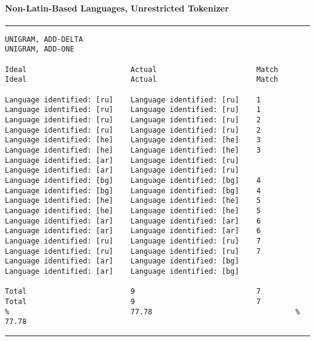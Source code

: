 \clearpage

\paragraph{Non-Latin-Based Languages, Unrestricted Tokenizer}

\tiny
\hrule\vskip4pt
\begin{verbatim}
UNIGRAM, ADD-DELTA                                                 UNIGRAM, ADD-ONE

Ideal                        Actual                       Match    Ideal                        Actual                       Match

Language identified: [ru]    Language identified: [ru]    1        Language identified: [ru]    Language identified: [ru]    1
Language identified: [ru]    Language identified: [ru]    2        Language identified: [ru]    Language identified: [ru]    2
Language identified: [he]    Language identified: [he]    3        Language identified: [he]    Language identified: [he]    3
Language identified: [ar]    Language identified: [ru]             Language identified: [ar]    Language identified: [ru]
Language identified: [bg]    Language identified: [bg]    4        Language identified: [bg]    Language identified: [bg]    4
Language identified: [he]    Language identified: [he]    5        Language identified: [he]    Language identified: [he]    5
Language identified: [ar]    Language identified: [ar]    6        Language identified: [ar]    Language identified: [ar]    6
Language identified: [ru]    Language identified: [ru]    7        Language identified: [ru]    Language identified: [ru]    7
Language identified: [ar]    Language identified: [bg]             Language identified: [ar]    Language identified: [bg]

Total                        9                            7        Total                        9                            7
%                            77.78                                 %                            77.78
\end{verbatim}
\vskip4pt\hrule


